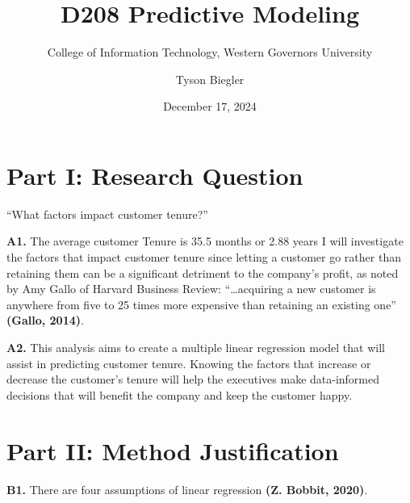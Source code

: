 \documentclass[
]{article}
\title{D208 Predictive Modeling}
\subtitle{College of Information Technology, Western Governors
University}
\author{Tyson Biegler}
\date{December 17, 2024}
\begin{document}
\maketitle

\section{Part I: Research Question}\label{part-i-research-question}

``What factors impact customer tenure?''

\textbf{A1.} The average customer Tenure is 35.5 months or 2.88 years I
will investigate the factors that impact customer tenure since letting a
customer go rather than retaining them can be a significant detriment to
the company's profit, as noted by Amy Gallo of Harvard Business Review:
``\ldots acquiring a new customer is anywhere from five to 25 times more
expensive than retaining an existing one'' \textbf{(Gallo, 2014)}.

\textbf{A2.} This analysis aims to create a multiple linear regression
model that will assist in predicting customer tenure. Knowing the
factors that increase or decrease the customer's tenure will help the
executives make data-informed decisions that will benefit the company
and keep the customer happy.

\section{Part II: Method
Justification}\label{part-ii-method-justification}

\textbf{B1.} There are four assumptions of linear regression \textbf{(Z.
Bobbit, 2020)}.
\end{document}
